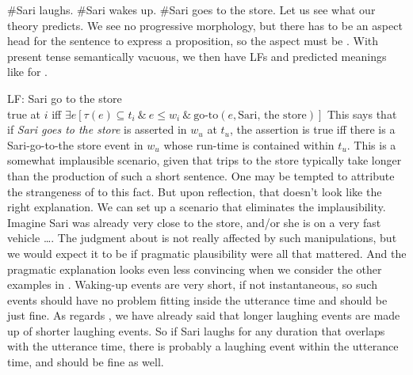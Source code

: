 \pex\label{ex:statives}
\a \#Sari laughs.
\a \#Sari wakes up.
\a \#Sari goes to the store.
\xe
%
Let us see what our theory predicts. We see no progressive morphology, but there
has to be an aspect head for the sentence to express a proposition, so the
aspect must be \pfv. With present tense semantically vacuous, we then have LFs
and predicted meanings like \Next for \Last[c].

\ex LF: \lb[TP] \pres \lb[AspP] \pfv \lb[VP] Sari go to the store \rb \rb  \rb\\
true at $i$ iff $\exists e [\tau(e)\subseteq t_{i}\ \&\ e\le w_{i}\ \&\
\text{go-to}(e,\text{Sari, the store})]$
\xe
%
This says that if \emph{Sari goes to the store} is asserted in $w_{u}$ at
$t_{u}$, the assertion is true iff there is a Sari-go-to-the store event in
$w_{u}$ whose run-time is contained within $t_{u}$. This is a somewhat
implausible scenario, given that trips to the store typically take longer than
the production of such a short sentence. One may be tempted to attribute the
strangeness of \LLast[c] to this fact. But upon reflection, that doesn't look
like the right explanation. We can set up a scenario that eliminates the
implausibility. Imagine Sari was already very close to the store, and/or she is
on a very fast vehicle \dots. The judgment about \LLast[c] is not really
affected by such manipulations, but we would expect it to be if pragmatic
plausibility were all that mattered. And the pragmatic explanation looks even
less convincing when we consider the other examples in \LLast. Waking-up events
are very short, if not instantaneous, so such events should have no problem
fitting inside the utterance time and \LLast[b] should be just fine. As regards
\LLast[a], we have already said that longer laughing events are made up of
shorter laughing events. So if Sari laughs for any duration that overlaps with
the utterance time, there is probably a laughing event within the utterance
time, and \LLast[a] should be fine as well.

